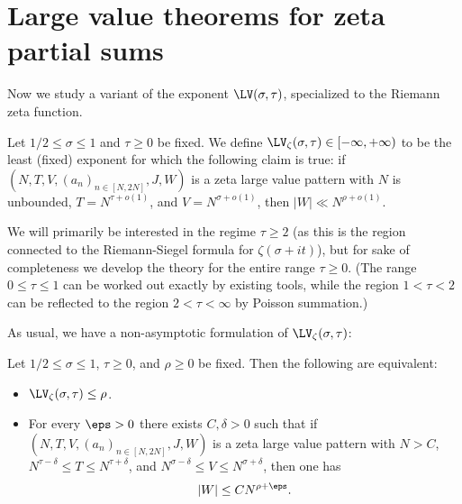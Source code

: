 \chapter{Large value theorems for zeta partial sums}\label{largevalue-zeta-chapter}

Now we study a variant of the exponent $\LV(\sigma,\tau)$, specialized to the Riemann zeta function.

\begin{definition}\label{lvz-def}
\leanok
Let $1/2 \leq \sigma \leq 1$ and $\tau \geq 0$ be fixed. We define $\LV_\zeta(\sigma,\tau) \in [-\infty, +\infty)$ to be the least (fixed) exponent for which the following claim is true: if $(N,T,V,(a_n)_{n \in [N,2N]},J,W)$ is a zeta large value pattern with $N$ is unbounded, $T = N^{\tau+o(1)}$, and $V = N^{\sigma+o(1)}$, then $|W| \ll N^{\rho+o(1)}$.
\end{definition}


We will primarily be interested in the regime $\tau \geq 2$ (as this is the region connected to the Riemann-Siegel formula for $\zeta(\sigma+it)$), but for sake of completeness we develop the theory for the entire range $\tau \geq 0$.  (The range $0 \leq \tau \leq 1$ can be worked out exactly by existing tools, while the region $1 < \tau < 2$ can be reflected to the region $2 < \tau < \infty$ by Poisson summation.)

As usual, we have a non-asymptotic formulation of $\LV_\zeta(\sigma,\tau)$:

\begin{lemma}\label{lvz-asymp} Let $1/2 \leq \sigma \leq 1$, $\tau \geq 0$, and $\rho \geq 0$  be fixed.  Then the following are equivalent:
    \begin{itemize}
        \item[(i)] $\LV_\zeta(\sigma,\tau) \leq \rho$.
        \item[(ii)] For every $\eps>0$ there exists $C,\delta>0$ such that if $(N,T,V,(a_n)_{n \in [N,2N]},J,W)$ is a zeta large value pattern with $N > C$, $N^{\tau-\delta} \leq T \leq N^{\tau+\delta}$, and $N^{\sigma-\delta} \leq V \leq N^{\sigma+\delta}$, then one has
              $$ |W| \leq C N^{\rho+\eps}.$$
    \end{itemize}
\end{lemma}

